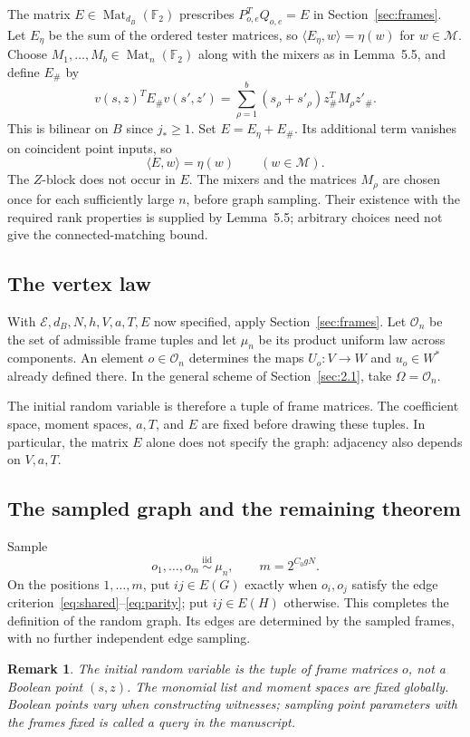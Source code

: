 \documentclass[11pt]{article}
\newtheorem{remark}{Remark}
\begin{document}
The matrix $E\in\operatorname{Mat}_{d_B}(\mathbb F_2)$ prescribes $P_{o,e}^TQ_{o,e}=E$ in Section~\ref{sec:frames}. Let $E_\eta$ be the sum of the ordered tester matrices, so $\langle E_\eta,w\rangle=\eta(w)$ for $w\in\mathcal M$. Choose $M_1,\ldots,M_b\in\operatorname{Mat}_n(\mathbb F_2)$ along with the mixers as in Lemma~5.5, and define $E_{\#}$ by
\[
v(s,z)^TE_\#v(s',z')=
\sum_{\rho=1}^b(s_\rho+s'_\rho)z_\#^TM_\rho z'_\#.
\]
This is bilinear on $B$ since $j_*\ge1$. Set $E=E_\eta+E_\#$. Its additional term vanishes on coincident point inputs, so
\[
\langle E,w\rangle=\eta(w)\qquad(w\in\mathcal M).
\]
The $Z$-block does not occur in $E$. The mixers and the matrices $M_\rho$ are chosen once for each sufficiently large $n$, before graph sampling. Their existence with the required rank properties is supplied by Lemma~5.5; arbitrary choices need not give the connected-matching bound.

\subsection{The vertex law}
With $\mathcal E,d_B,N,h,V,a,T,E$ now specified, apply Section~\ref{sec:frames}. Let $\mathcal O_n$ be the set of admissible frame tuples and let $\mu_n$ be its product uniform law across components. An element $o\in\mathcal O_n$ determines the maps $U_o:V\to W$ and $u_o\in W^*$ already defined there. In the general scheme of Section~\ref{sec:2.1}, take $\Omega=\mathcal O_n$.

The initial random variable is therefore a tuple of frame matrices. The coefficient space, moment spaces, $a,T$, and $E$ are fixed before drawing these tuples. In particular, the matrix $E$ alone does not specify the graph: adjacency also depends on $V,a,T$.

\subsection{The sampled graph and the remaining theorem}
Sample
\[
o_1,\ldots,o_m\ \overset{\mathrm{iid}}{\sim}\ \mu_n,
\qquad m=2^{C_0gN}.
\]
On the positions $1,\ldots,m$, put $ij\in E(G)$ exactly when $o_i,o_j$ satisfy the edge criterion~\eqref{eq:shared}--\eqref{eq:parity}; put $ij\in E(H)$ otherwise. This completes the definition of the random graph. Its edges are determined by the sampled frames, with no further independent edge sampling.

\begin{remark}
The initial random variable is the tuple of frame matrices $o$, not a Boolean point $(s,z)$. The monomial list and moment spaces are fixed globally. Boolean points vary when constructing witnesses; sampling point parameters with the frames fixed is called a query in the manuscript.
\end{remark}
\end{document}
